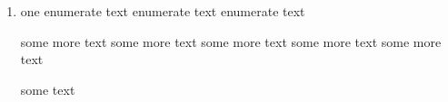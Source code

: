 \begin{enumerate}
	\item one
	      enumerate text
	      enumerate text
	      enumerate text
	      \begin{myenv}
		      some more text
		      some more text
		      some more text
		      some more text
		      some more text
	      \end{myenv}
	      some text
\end{enumerate}
